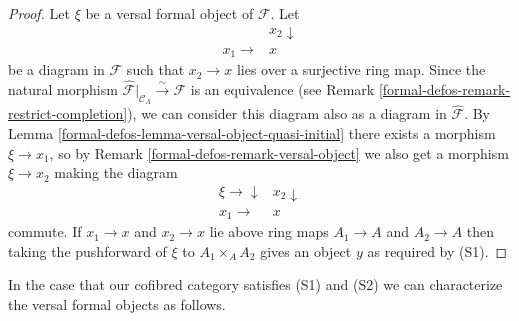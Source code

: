 \begin{proof}
Let $\xi$ be a versal formal object of $\mathcal{F}$. Let
$$
\begin{array}{cc} & x_2 \downarrow \\ x_1 \longrightarrow & x\end{array}
$$
be a diagram in $\mathcal{F}$ such that $x_2 \to x$ lies over a
surjective ring map. Since the natural morphism
$\widehat{\mathcal{F}}|_{\mathcal{C}_\Lambda} \xrightarrow{\sim} \mathcal{F}$
is an equivalence (see
Remark \ref{formal-defos-remark-restrict-completion}), we can consider this
diagram also as a diagram in $\widehat{\mathcal{F}}$. By
Lemma \ref{formal-defos-lemma-versal-object-quasi-initial} there exists a morphism
$\xi \to x_1$, so by
Remark \ref{formal-defos-remark-versal-object} we also get a
morphism $\xi \to x_2$ making the diagram
$$
\begin{array}{cc}\xi \longrightarrow\downarrow & x_2 \downarrow \\ x_1 \longrightarrow & x\end{array}
$$
commute. If $x_1 \to x$ and $x_2 \to x$ lie above ring maps
$A_1 \to A$ and $A_2 \to A$ then taking the pushforward of
$\xi$ to $A_1 \times_A A_2$ gives an object $y$ as required by (S1).
\end{proof}

In the case that our cofibred category satisfies (S1) and (S2)
we can characterize the versal formal objects as follows.

